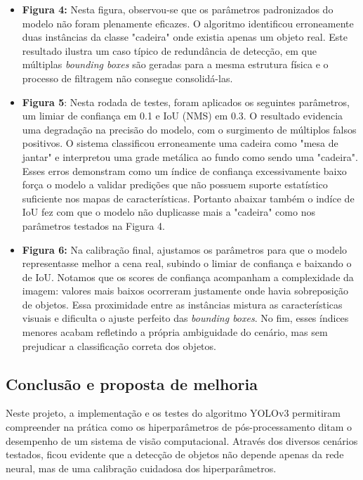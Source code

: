 \documentclass[conference]{IEEEtran}
\begin{document}
 \begin{itemize}
     \item \textbf{Figura 4:} Nesta figura, observou-se que os parâmetros padronizados do modelo não foram plenamente eficazes. O algoritmo identificou erroneamente duas instâncias da classe "cadeira" onde existia apenas um objeto real. Este resultado ilustra um caso típico de redundância de detecção, em que múltiplas \textit{bounding boxes} são geradas para a mesma estrutura física e o processo de filtragem não consegue consolidá-las. 

     \item \textbf{Figura 5}: Nesta rodada de testes, foram aplicados os seguintes parâmetros, um limiar de confiança em 0.1 e IoU (NMS) em 0.3. O resultado evidencia uma degradação na precisão do modelo, com o surgimento de múltiplos falsos positivos. O sistema classificou erroneamente uma cadeira como "mesa de jantar" e interpretou uma grade metálica ao fundo como sendo uma "cadeira". Esses erros demonstram como um índice de confiança excessivamente baixo força o modelo a validar predições que não possuem suporte estatístico suficiente nos mapas de características. Portanto abaixar também o indíce de IoU fez com que o modelo não duplicasse mais a "cadeira" como nos parâmetros testados na Figura 4. 

     \item \textbf{Figura 6:} Na calibração final, ajustamos os parâmetros para que o modelo representasse melhor a cena real, subindo o limiar de confiança e baixando o de IoU. Notamos que os scores de confiança acompanham a complexidade da imagem: valores mais baixos ocorreram justamente onde havia sobreposição de objetos. Essa proximidade entre as instâncias mistura as características visuais e dificulta o ajuste perfeito das \textit{bounding boxes}. No fim, esses índices menores acabam refletindo a própria ambiguidade do cenário, mas sem prejudicar a classificação correta dos objetos. 
 \end{itemize}

\subsection{Conclusão e proposta de melhoria}\label{AA}

Neste projeto, a implementação e os testes do algoritmo YOLOv3 permitiram compreender na prática como os hiperparâmetros de pós-processamento ditam o desempenho de um sistema de visão computacional. Através dos diversos cenários testados, ficou evidente que a detecção de objetos não depende apenas da rede neural, mas de uma calibração cuidadosa dos hiperparâmetros.
\end{document}
